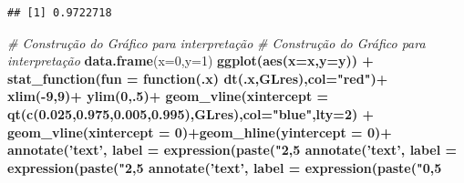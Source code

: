 \documentclass[
]{book}
\newenvironment{Shaded}{\begin{snugshade}}{\end{snugshade}}
\newcommand{\CommentTok}[1]{\textcolor[rgb]{0.56,0.35,0.01}{\textit{#1}}}
\newcommand{\ControlFlowTok}[1]{\textcolor[rgb]{0.13,0.29,0.53}{\textbf{#1}}}
\newcommand{\DataTypeTok}[1]{\textcolor[rgb]{0.13,0.29,0.53}{#1}}
\newcommand{\DecValTok}[1]{\textcolor[rgb]{0.00,0.00,0.81}{#1}}
\newcommand{\FloatTok}[1]{\textcolor[rgb]{0.00,0.00,0.81}{#1}}
\newcommand{\KeywordTok}[1]{\textcolor[rgb]{0.13,0.29,0.53}{\textbf{#1}}}
\newcommand{\NormalTok}[1]{#1}
\newcommand{\OperatorTok}[1]{\textcolor[rgb]{0.81,0.36,0.00}{\textbf{#1}}}
\newcommand{\StringTok}[1]{\textcolor[rgb]{0.31,0.60,0.02}{#1}}
\begin{document}
\begin{verbatim}
## [1] 0.9722718
\end{verbatim}

\begin{Shaded}
\begin{Highlighting}[]
\CommentTok{# Construção do Gráfico para interpretação}
\CommentTok{# Construção do Gráfico para interpretação}
\KeywordTok{data.frame}\NormalTok{(}\DataTypeTok{x=}\DecValTok{0}\NormalTok{,}\DataTypeTok{y=}\DecValTok{1}\NormalTok{) }\OperatorTok{%
\StringTok{  }\KeywordTok{ggplot}\NormalTok{(}\KeywordTok{aes}\NormalTok{(}\DataTypeTok{x=}\NormalTok{x,}\DataTypeTok{y=}\NormalTok{y)) }\OperatorTok{+}\StringTok{ }
\StringTok{  }\KeywordTok{stat_function}\NormalTok{(}\DataTypeTok{fun =} \ControlFlowTok{function}\NormalTok{(.x) }\KeywordTok{dt}\NormalTok{(.x,GLres),}\DataTypeTok{col=}\StringTok{"red"}\NormalTok{)}\OperatorTok{+}
\StringTok{  }\KeywordTok{xlim}\NormalTok{(}\OperatorTok{-}\DecValTok{9}\NormalTok{,}\DecValTok{9}\NormalTok{)}\OperatorTok{+}\StringTok{ }\KeywordTok{ylim}\NormalTok{(}\DecValTok{0}\NormalTok{,.}\DecValTok{5}\NormalTok{)}\OperatorTok{+}
\StringTok{  }\KeywordTok{geom_vline}\NormalTok{(}\DataTypeTok{xintercept =} \KeywordTok{qt}\NormalTok{(}\KeywordTok{c}\NormalTok{(}\FloatTok{0.025}\NormalTok{,}\FloatTok{0.975}\NormalTok{,}\FloatTok{0.005}\NormalTok{,}\FloatTok{0.995}\NormalTok{),GLres),}\DataTypeTok{col=}\StringTok{"blue"}\NormalTok{,}\DataTypeTok{lty=}\DecValTok{2}\NormalTok{) }\OperatorTok{+}
\StringTok{  }\KeywordTok{geom_vline}\NormalTok{(}\DataTypeTok{xintercept =} \DecValTok{0}\NormalTok{)}\OperatorTok{+}\KeywordTok{geom_hline}\NormalTok{(}\DataTypeTok{yintercept =} \DecValTok{0}\NormalTok{)}\OperatorTok{+}
\StringTok{  }\KeywordTok{annotate}\NormalTok{(}\StringTok{'text'}\NormalTok{, }\DataTypeTok{label =} \KeywordTok{expression}\NormalTok{(}\KeywordTok{paste}\NormalTok{(}\StringTok{"2,5%
\StringTok{  }\KeywordTok{annotate}\NormalTok{(}\StringTok{'text'}\NormalTok{, }\DataTypeTok{label =} \KeywordTok{expression}\NormalTok{(}\KeywordTok{paste}\NormalTok{(}\StringTok{"2,5%
\StringTok{  }\KeywordTok{annotate}\NormalTok{(}\StringTok{'text'}\NormalTok{, }\DataTypeTok{label =} \KeywordTok{expression}\NormalTok{(}\KeywordTok{paste}\NormalTok{(}\StringTok{"0,5%
}}}}
\end{Highlighting}
\end{Shaded}
\end{document}
